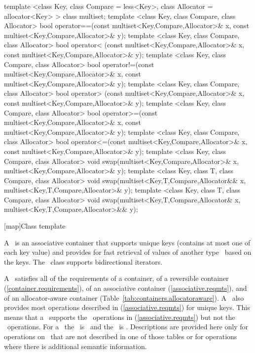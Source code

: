 \documentclass[american,twoside]{book}
\begin{document}
\begin{codeblock}
{  template <class Key, class Compare = less<Key>,
            class Allocator = allocator<Key> >
    class multiset;
  template <class Key, class Compare, class Allocator>
    bool operator==(const multiset<Key,Compare,Allocator>& x,
                    const multiset<Key,Compare,Allocator>& y);
  template <class Key, class Compare, class Allocator>
    bool operator< (const multiset<Key,Compare,Allocator>& x,
                    const multiset<Key,Compare,Allocator>& y);
  template <class Key, class Compare, class Allocator>
    bool operator!=(const multiset<Key,Compare,Allocator>& x,
                    const multiset<Key,Compare,Allocator>& y);
  template <class Key, class Compare, class Allocator>
    bool operator> (const multiset<Key,Compare,Allocator>& x,
                    const multiset<Key,Compare,Allocator>& y);
  template <class Key, class Compare, class Allocator>
    bool operator>=(const multiset<Key,Compare,Allocator>& x,
                    const multiset<Key,Compare,Allocator>& y);
  template <class Key, class Compare, class Allocator>
    bool operator<=(const multiset<Key,Compare,Allocator>& x,
                    const multiset<Key,Compare,Allocator>& y);
  template <class Key, class Compare, class Allocator>
    void swap(multiset<Key,Compare,Allocator>& x,
              multiset<Key,Compare,Allocator>& y);
  template <class Key, class T, class Compare, class Allocator>
    void swap(multiset<Key,T,Compare,Allocator&& x,
              multiset<Key,T,Compare,Allocator>& y);
  template <class Key, class T, class Compare, class Allocator>
    void swap(multiset<Key,T,Compare,Allocator& x,
              multiset<Key,T,Compare,Allocator>&& y);
}
\end{codeblock}

[map]{Class template }%

\pnum
A \ is an associative container that
supports unique keys (contains at most one of each key value) and
provides for fast retrieval of values of another type \ based
on the keys. The \ class supports bidirectional iterators.

\pnum
A
\
satisfies all of the requirements of a container, of a reversible container
(\ref{container.requirements}), of
an associative container (\ref{associative.reqmts}), and of an allocator-aware container (Table~\ref{tab:containers.allocatoraware}).
A
\
also provides most operations described in (\ref{associative.reqmts})
for unique keys.
This means that a
\
supports the
\
operations in (\ref{associative.reqmts})
but not the
\tcode{a_eq}\
operations.
For a
\tcode{map<Key,T>}\
the
\
is
\tcode{Key}\
and the
\
is
.
Descriptions are provided here only for operations on
\
that are not described in one of those tables
or for operations where there is additional semantic information.
\end{document}
